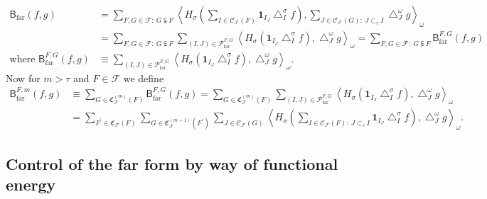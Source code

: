 \documentclass{amsart}%
\theoremstyle{plain}
\numberwithin{equation}{section}
\begin{document}
\begin{align*}
\mathsf{B}_{\operatorname{far}}\left(  f,g\right)   & =\sum_{F,G\in
\mathcal{F}:\ G\subsetneqq F}\left\langle H_{\sigma}\left(  \sum
_{I\in\mathcal{C}_{\mathcal{F}}\left(  F\right)  }\mathbf{1}_{I_{J}%
}\bigtriangleup_{I}^{\sigma}f\right)  ,\sum_{J\in\mathcal{C}_{\mathcal{F}%
}\left(  G\right)  :\ J\subset_{\tau}I}\bigtriangleup_{J}^{\omega
}g\right\rangle _{\omega}\\
& =\sum_{F,G\in\mathcal{F}:\ G\subsetneqq F}\sum_{\left(  I,J\right)
\in\mathcal{P}_{\operatorname{far}}^{F,G}}\left\langle H_{\sigma}\left(
\mathbf{1}_{I_{J}}\bigtriangleup_{I}^{\sigma}f\right)  ,\bigtriangleup
_{J}^{\omega}g\right\rangle _{\omega}=\sum_{F,G\in\mathcal{F}:\ G\subsetneqq
F}\mathsf{B}_{\operatorname{far}}^{F,G}\left(  f,g\right) \\
\text{where }\mathsf{B}_{\operatorname{far}}^{F,G}\left(  f,g\right)   &
\equiv\sum_{\left(  I,J\right)  \in\mathcal{P}_{\operatorname{far}}^{F,G}%
}\left\langle H_{\sigma}\left(  \mathbf{1}_{I_{J}}\bigtriangleup_{I}^{\sigma
}f\right)  ,\bigtriangleup_{J}^{\omega}g\right\rangle _{\omega}.
\end{align*}
Now for $m>\tau$ and $F\in\mathcal{F}$ we define%
\begin{align*}
\mathsf{B}_{\operatorname{far}}^{F,m}\left(  f,g\right)   & \equiv\sum
_{G\in\mathfrak{C}_{\mathcal{F}}^{\left(  m\right)  }\left(  F\right)
}\mathsf{B}_{\operatorname{far}}^{F,G}\left(  f,g\right)  =\sum_{G\in
\mathfrak{C}_{\mathcal{F}}^{\left(  m\right)  }\left(  F\right)  }%
\sum_{\left(  I,J\right)  \in\mathcal{P}_{\operatorname{far}}^{F,G}%
}\left\langle H_{\sigma}\left(  \mathbf{1}_{I_{J}}\bigtriangleup_{I}^{\sigma
}f\right)  ,\bigtriangleup_{J}^{\omega}g\right\rangle _{\omega}\\
& =\sum_{F^{\prime}\in\mathfrak{C}_{\mathcal{F}}\left(  F\right)  }\sum
_{G\in\mathfrak{C}_{\mathcal{F}}^{\left(  m-1\right)  }\left(  F^{\prime
}\right)  }\sum_{J\in\mathcal{C}_{\mathcal{F}}\left(  G\right)  }\left\langle
H_{\sigma}\left(  \sum_{I\in\mathcal{C}_{\mathcal{F}}\left(  F\right)
:\ J\subset_{\tau}I}\mathbf{1}_{I_{J}}\bigtriangleup_{I}^{\sigma}f\right)
,\bigtriangleup_{J}^{\omega}g\right\rangle _{\omega}.
\end{align*}


\subsection{Control of the far form by way of functional energy}
\end{document}
